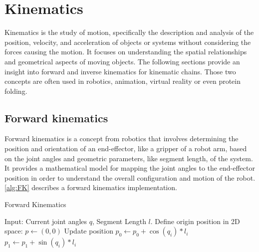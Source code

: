 % 

\section{Kinematics}

Kinematics is the study of motion, specifically the description and analysis of the position, velocity, and acceleration of objects or systems without considering the forces causing the motion. It focuses on understanding the spatial relationships and geometrical aspects of moving objects. The following sections provide an insight into forward and inverse kinematics for kinematic chains. Those two concepts are often used in robotics, animation, virtual reality or even protein folding. 

\subsection{Forward kinematics}

Forward kinematics is a concept from robotics that involves determining the position and orientation of an end-effector, like a gripper of a robot arm, based on the joint angles and geometric parameters, like segment length, of the system. It provides a mathematical model for mapping the joint angles to the end-effector position in order to understand the overall configuration and motion of the robot. \eqref{alg:FK} describes a forward kinematics implementation. 
% 

\begin{algorithm}
    \caption{Forward Kinematics}\label{alg:FK}
    \begin{algorithmic}
        \State{} Input: Current joint angles $q$, Segment Length $l$.
        \State{} Define origin position in 2D space: $p \leftarrow (0, 0)$
            \State{} Update position
            \State{} $p_0 \leftarrow p_0 + \cos(q_i) * l_i$
            \State{} $p_1 \leftarrow p_1 + \sin(q_i) * l_i$
        \EndFor{}
\end{algorithmic}
\end{algorithm}

